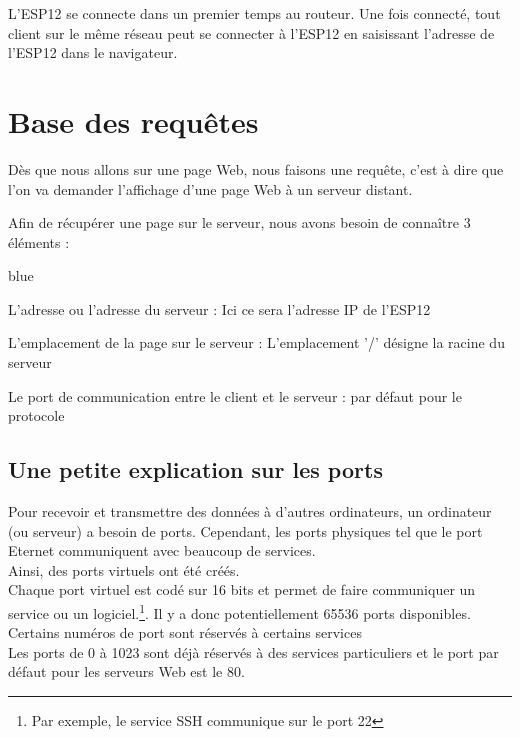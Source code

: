 L'ESP12 se connecte dans un premier temps au routeur. 
Une fois connecté, tout client sur le même réseau peut se connecter à l'ESP12 en saisissant l'adresse de 
l'ESP12 dans le navigateur.

\section{Base des requêtes}

Dès que nous allons sur une page Web, nous faisons une requête, c'est à dire que l'on va demander l'affichage 
d'une page Web à un serveur distant.


Afin de récupérer une page sur le serveur, nous avons besoin de connaître 3 éléments :

\begin{items}{blue}{\Triangle}
    \item L'adresse  ou l'adresse du serveur : Ici ce sera l'adresse IP de l'ESP12
    \item L'emplacement de la page sur le serveur : L'emplacement '/' désigne la racine du serveur
    \item Le port de communication entre le client et le serveur :  par défaut pour 
    le protocole  
\end{items}


\subsection{Une petite explication sur les ports}

Pour recevoir et transmettre des données à d’autres ordinateurs, un ordinateur (ou serveur) a
besoin de ports. Cependant, les ports physiques tel que le port Eternet communiquent avec beaucoup de services.\\

Ainsi, des ports virtuels ont été créés. \\


Chaque port virtuel est codé sur 16 bits et permet de faire communiquer un service
ou un logiciel.\footnote{Par exemple, le service SSH communique sur le port 22}. Il y a donc potentiellement
65536 ports disponibles. Certains numéros de port sont réservés à certains services \\
Les ports de 0 à 1023 sont déjà réservés à des services particuliers et le port par défaut pour les serveurs Web est le 80.

